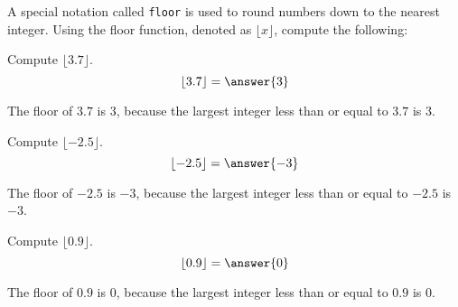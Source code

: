 \documentclass{ximera}
\author{Jont Allen}
\begin{document}
    A special notation called \texttt{floor} is used to round numbers down to the nearest integer. 
    Using the floor function, denoted as $\lfloor x \rfloor$, compute the following:    
    \begin{problem}
    Compute $\lfloor 3.7 \rfloor$.
    \[
        \lfloor 3.7 \rfloor = \answer{3}
    \]
    \begin{feedback}[correct]
    The floor of $3.7$ is $3$, because the largest integer less than or equal to $3.7$ is $3$.
    \end{feedback}
    \end{problem}
    
    \begin{problem}
    Compute $\lfloor -2.5 \rfloor$.
    \[
        \lfloor -2.5 \rfloor = \answer{-3}
    \]
    \begin{feedback}[correct]
    The floor of $-2.5$ is $-3$, because the largest integer less than or equal to $-2.5$ is $-3$.
\end{feedback}

    \end{problem}
    
    \begin{problem}
    Compute $\lfloor 0.9 \rfloor$.
    \[
        \lfloor 0.9 \rfloor= \answer{0}
    \]
    \begin{feedback}[correct]
    The floor of $0.9$ is $0$, because the largest integer less than or equal to $0.9$ is $0$.
\end{feedback}

    \end{problem}
    
\end{document}
